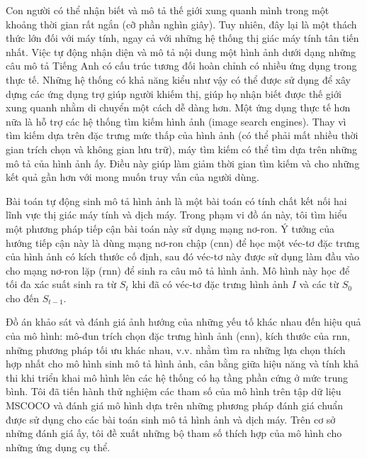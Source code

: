 \begin{vnabstract}
	\indent Con người có thể nhận biết và mô tả thế giới xung quanh mình trong một khoảng thời gian rất ngắn (cỡ phần nghìn giây). Tuy nhiên, đây lại là một thách thức lớn đối với máy tính, ngay cả với những hệ thống thị giác máy tính tân tiến nhất. Việc tự động nhận diện và mô tả nội dung một hình ảnh dưới dạng những câu mô tả Tiếng Anh có cấu trúc tương đối hoàn chỉnh có nhiều ứng dụng trong thực tế.  Những hệ thống có khả năng kiểu như vậy có thể được sử dụng để xây dựng các ứng dụng trợ giúp người khiếm thị, giúp họ nhận biết được thế giới xung quanh nhằm di chuyển một cách dễ dàng hơn. Một ứng dụng thực tế hơn nữa là hỗ trợ các hệ thống tìm kiếm hình ảnh (image search engines). Thay vì tìm kiếm dựa trên đặc trưng mức thấp của hình ảnh (có thể phải mất nhiều thời gian trích chọn và không gian lưu trữ), máy tìm kiếm có thể tìm dựa trên những mô tả của hình ảnh ấy. Điều này giúp làm giảm thời gian tìm kiếm và cho những kết quả gần hơn với mong muốn truy vấn của người dùng.

	Bài toán tự động sinh mô tả hình ảnh là một bài toán có tính chất kết nối hai lĩnh vực thị giác máy tính và dịch máy. Trong phạm vi đồ án này, tôi tìm hiểu một phương pháp tiếp cận bài toán này sử dụng mạng nơ-ron. Ý tưởng của hướng tiếp cận này là dùng mạng nơ-ron chập (\gls{cnn}) để học một véc-tơ đặc trưng của hình ảnh có kích thước cố định, sau đó véc-tơ này được sử dụng làm đầu vào cho mạng nơ-ron lặp (\gls{rnn}) để sinh ra câu mô tả hình ảnh. Mô hình này học để tối đa xác suất sinh ra từ $S_t$ khi đã có véc-tơ đặc trưng hình ảnh $I$ và các từ $S_0$ cho đến $S_{t-1}$.

	Đồ án khảo sát và đánh giá ảnh hướng của những yếu tố khác nhau đến hiệu quả của mô hình: mô-đun trích chọn đặc trưng hình ảnh (\gls{cnn}), kích thước của \gls{rnn}, những phương pháp tối ưu khác nhau, v.v. nhằm tìm ra những lựa chọn thích hợp nhất cho mô hình sinh mô tả hình ảnh, cân bằng giữa hiệu năng và tính khả thi khi triển khai mô hình lên các hệ thống có hạ tầng phần cứng ở mức trung bình. Tôi đã tiến hành thử nghiệm các tham số của mô hình trên tập dữ liệu MSCOCO và đánh giá mô hình dựa trên những phương pháp đánh giá chuẩn được sử dụng cho các bài toán sinh mô tả hình ảnh và dịch máy. Trên cơ sở những đánh giá ấy, tôi đề xuất những bộ tham số thích hợp của mô hình cho những ứng dụng cụ thể.

\end{vnabstract}